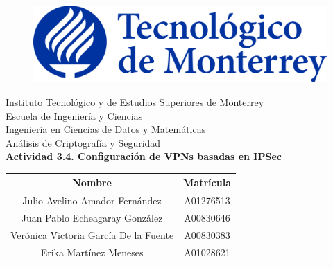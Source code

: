 \documentclass{article}
\begin{document}
    \begin{titlepage}
        \begin{center}
            \begin{figure}
                \centering
                \includegraphics[scale=0.13]{../../img/logo_itesm.png}\\ %
            \end{figure}
            \vspace{5cm}
            \LARGE{Instituto Tecnológico y de Estudios Superiores de Monterrey}\\
            \vspace{1cm}
            \large Escuela de Ingeniería y Ciencias \\
            \vspace{0.2cm}
            \large Ingeniería en Ciencias de Datos y Matemáticas \\
            \vspace{0.2cm}
            \large Análisis de Criptografía y Seguridad\\
            \vspace{1cm}
            \textbf{Actividad 3.4. Configuración de VPNs basadas en IPSec}\\ %
            \vspace{0.7cm}
            \begin{table}[h!]
                \centering
                \begin{tabular}{ ||c|c|| }
                    \hline
                    Nombre & Matrícula \\
                    \hline
                    Julio Avelino Amador Fernández & A01276513 \\
                    \hline
                    Juan Pablo Echeagaray González & A00830646 \\
                    \hline
                    Verónica Victoria García De la Fuente & A00830383 \\
                    \hline
                    Erika Martínez Meneses & A01028621 \\

\end{tabular}
\end{table}
\end{center}
\end{titlepage}
\end{document}
